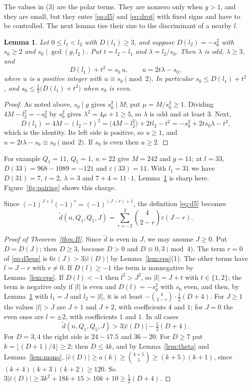 \documentclass[11pt]{amsart}
\newtheorem{lemma}[theorem]{Lemma}
\theoremstyle{definition}
\newcommand{\cc}{\hat c}
\newcommand{\dt}{\tilde d}
\begin{document}
The values in (3) are the polar terms. They are nonzero only when $g>1$, and they are small, but they enter \eqref{eq:d5} and \eqref{eq:drot} with fixed signs and have to be controlled. The next lemma ties their size to the discriminant of a nearby $l$.

\begin{lemma}\label{lem:polar}
Let $0\le l_1<l_2$ with $D(l_1)\ge3$, and suppose $D(l_2)=-s_0^2$ with $s_0\ge2$ and $s_0\mid\gcd(g,l_2)$. Put $t=l_2-l_1$ and $\lambda=l_2/s_0$. Then $\lambda$ is odd, $\lambda\ge3$, and
\[
D(l_1)+t^2=s_0\,u,\qquad u=2t\lambda-s_0,
\]
where $u$ is a positive integer with $u\equiv s_0\pmod 2$. In particular $s_0\le D(l_1)+t^2$, and $s_0\le\frac12\bigl(D(l_1)+t^2\bigr)$ when $s_0$ is even.
\end{lemma}

\begin{proof}
As noted above, $s_0\mid g$ gives $s_0^2\mid M$; put $\mu=M/s_0^2\ge1$. Dividing $4M-l_2^2=-s_0^2$ by $s_0^2$ gives $\lambda^2=4\mu+1\ge5$, so $\lambda$ is odd and at least $3$. Next,
\[
D(l_1)=4M-(l_2-t)^2=\bigl(4M-l_2^2\bigr)+2tl_2-t^2=-s_0^2+2ts_0\lambda-t^2,
\]
which is the identity. Its left side is positive, so $u\ge1$, and $u=2t\lambda-s_0\equiv s_0\pmod 2$. If $s_0$ is even then $u\ge2$.
\end{proof}

For example $Q_1=11$, $Q_5=1$, $n=22$ give $M=242$ and $g=11$; at $l=33$, $D(33)=968-1089=-121$ and $\varepsilon(33)=11$. With $l_1=31$ we have $D(31)=7$, $t=2$, $\lambda=3$ and $7+4=11\cdot1$. Lemma~\ref{lem:polar} is sharp here. Figure~\ref{fig:pairing} shows this charge.

Since $(-1)^{J+1}(-1)^r=(-1)^{(J-r)+1}$, the definition \eqref{eq:d5} becomes
\begin{equation}\label{eq:d5eps}
\dt(n,Q_1,Q_5,J)=\sum_{r=-2}^{2}\binom{4}{2-r}\varepsilon(J-r).
\end{equation}

\begin{proof}[Proof of Theorem~\ref{thm:B}]
Since $\dt$ is even in $J$, we may assume $J\ge0$. Put $D=D(J)$; then $D\ge3$, because $D>0$ and $D\equiv0,3\pmod4$. The term $r=0$ of \eqref{eq:d5eps} is $6\varepsilon(J)>3|\cc(D)|$ by Lemma~\ref{lem:eps}(1). The other terms have $l=J-r$ with $r\ne0$. If $D(l)\ge-1$ the term is nonnegative by Lemma~\ref{lem:eps}. If $D(l)<-1$ then $l^2>J^2$, so $|l|=J+t$ with $t\in\{1,2\}$; the term is negative only if $|l|$ is even and $D(l)=-s_0^2$ with $s_0$ even, and then, by Lemma~\ref{lem:polar} with $l_1=J$ and $l_2=|l|$, it is at least $-\binom4{2-r}\cdot\frac12(D+4)$. For $J\ge1$ the values $|l|>J$ are $J+1$ and $J+2$, with coefficients $4$ and $1$; for $J=0$ the even ones are $l=\pm2$, with coefficients $1$ and $1$. In all cases
\[
\dt(n,Q_1,Q_5,J)>3|\cc(D)|-\tfrac52(D+4).
\]
For $D=3,4$ the right side is $24-17.5$ and $36-20$. For $D\ge7$ put $k=\lfloor(D+1)/4\rfloor\ge2$; then $D\le 4k$, and by Lemma~\ref{lem:theta} and Lemma~\ref{lem:mono}, $|\cc(D)|\ge a(k)\ge\binom{k+5}5\ge(k+5)(k+1)$, since $(k+4)(k+3)(k+2)\ge120$. So $3|\cc(D)|\ge3k^2+18k+15>10k+10\ge\frac52(D+4)$.
\end{proof}
\end{document}
